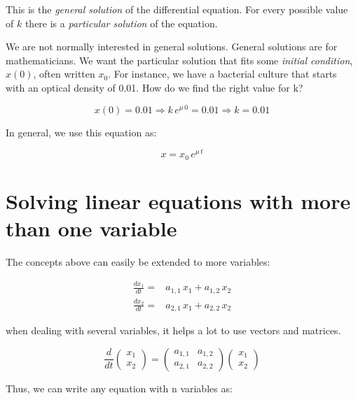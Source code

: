 \documentclass[12pt]{article}
\begin{document}
This is the \emph{general solution} of the differential equation. For every possible value of $k$ there is a \emph{particular solution} of the equation.

We are not normally interested in general solutions. General solutions are for mathematicians. We want the particular solution that fits some \emph{initial condition}, $x(0)$, often written $x_0$. For instance, we have a bacterial culture that starts with an optical density of 0.01. How do we find the right value for k?


\begin{equation}
x(0) = 0.01 \Rightarrow	 k \, e^{\mu \, 0} = 0.01 \Rightarrow	k=0.01 
\end{equation}

In general, we use this equation as:

\begin{equation}
	x   = x_0 \, e^{\mu \, t}
\end{equation}

\section{Solving linear equations with more than one variable}

The concepts above can easily be extended to more variables:

\begin{align}
	\label{odenvar}
	\frac{dx_1}{dt} =& a_{1,1} \, x_1 + a_{1,2} \, x_2 \nonumber\\
	\frac{dx_2}{dt} =& a_{2,1} \, x_1 + a_{2,2} \, x_2
\end{align}

when dealing with several variables, it helps a lot to use vectors and matrices.

\begin{equation}
	\frac{d}{dt} \begin{pmatrix} x_1\\ x_2 \end{pmatrix} = \begin{pmatrix} a_{1,1} & a_{1,2}\\ a_{2,1} & a_{2,2} \end{pmatrix} \begin{pmatrix} x_1\\ x_2 \end{pmatrix}
\end{equation}

Thus, we can write any equation with n variables as:
\end{document}
